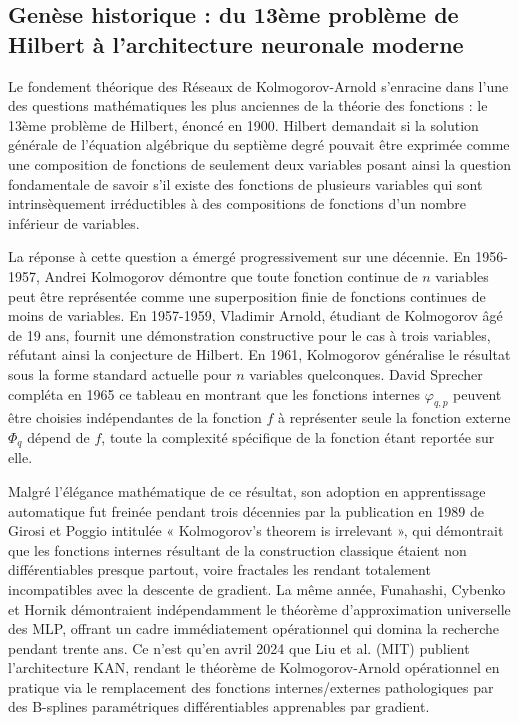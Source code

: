 \documentclass[11pt,a4paper,oneside]{report}
\theoremstyle{definition}
\theoremstyle{remark}
\begin{document}
\subsection{Genèse historique : du 13ème problème de Hilbert à l'architecture neuronale moderne}

Le fondement théorique des Réseaux de Kolmogorov-Arnold s'enracine dans l'une des questions mathématiques les plus anciennes de la théorie des fonctions : le 13ème problème de Hilbert, énoncé en 1900. Hilbert demandait si la solution générale de l'équation algébrique du septième degré pouvait être exprimée comme une composition de fonctions de seulement deux variables  posant ainsi la question fondamentale de savoir s'il existe des fonctions de plusieurs variables qui sont intrinsèquement irréductibles à des compositions de fonctions d'un nombre inférieur de variables.

La réponse à cette question a émergé progressivement sur une décennie. En 1956-1957, Andrei Kolmogorov démontre que toute fonction continue de $n$ variables peut être représentée comme une superposition finie de fonctions continues de moins de variables. En 1957-1959, Vladimir Arnold, étudiant de Kolmogorov âgé de 19 ans, fournit une démonstration constructive pour le cas à trois variables, réfutant ainsi la conjecture de Hilbert. En 1961, Kolmogorov généralise le résultat sous la forme standard actuelle pour $n$ variables quelconques. David Sprecher compléta en 1965 ce tableau en montrant que les fonctions internes $\varphi_{q,p}$ peuvent être choisies indépendantes de la fonction $f$ à représenter  seule la fonction externe $\Phi_q$ dépend de $f$, toute la complexité spécifique de la fonction étant reportée sur elle.

Malgré l'élégance mathématique de ce résultat, son adoption en apprentissage automatique fut freinée pendant trois décennies par la publication en 1989 de Girosi et Poggio intitulée « Kolmogorov's theorem is irrelevant », qui démontrait que les fonctions internes résultant de la construction classique étaient non différentiables presque partout, voire fractales  les rendant totalement incompatibles avec la descente de gradient. La même année, Funahashi, Cybenko et Hornik démontraient indépendamment le théorème d'approximation universelle des MLP, offrant un cadre immédiatement opérationnel qui domina la recherche pendant trente ans. Ce n'est qu'en avril 2024 que Liu et al. (MIT) publient l'architecture KAN, rendant le théorème de Kolmogorov-Arnold opérationnel en pratique via le remplacement des fonctions internes/externes pathologiques par des B-splines paramétriques différentiables apprenables par gradient.
\end{document}
